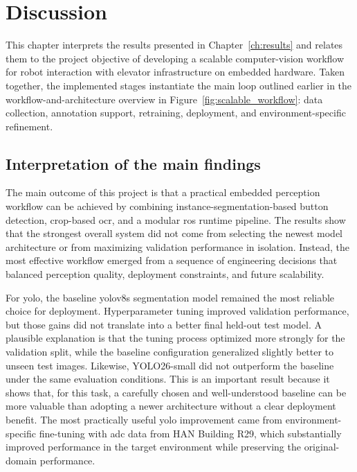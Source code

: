 \chapter{Discussion}
\label{ch:discussion}

This chapter interprets the results presented in Chapter~\ref{ch:results} and relates them to
the project objective of developing a scalable computer-vision
workflow for robot interaction with elevator infrastructure on embedded
hardware. Taken together, the implemented stages instantiate the main loop
outlined earlier in the workflow-and-architecture overview in
Figure~\ref{fig:scalable_workflow}: data collection, annotation support,
retraining, deployment, and environment-specific refinement.

\section{Interpretation of the main findings}

The main outcome of this project is that a practical embedded perception
workflow can be achieved by combining instance-segmentation-based button
detection, crop-based \gls{ocr}, and a modular \gls{ros} runtime pipeline. The
results show that the strongest overall system did not come from selecting the
newest model architecture or from maximizing validation performance in isolation.
Instead, the most effective workflow emerged from a sequence of engineering
decisions that balanced perception quality, deployment constraints, and future
scalability.

For \gls{yolo}, the baseline \gls{yolo}v8s segmentation model remained the most reliable
choice for deployment. Hyperparameter tuning improved validation performance, but
those gains did not translate into a better final held-out test model. A
plausible explanation is that the tuning process optimized more strongly for the
validation split, while the baseline configuration generalized slightly better
to unseen test images. Likewise, YOLO26-small did not outperform the baseline
under the same evaluation conditions. This is an important result because it shows that, for this task, a
carefully chosen and well-understood baseline can be more valuable than adopting
a newer architecture without a clear deployment benefit. The most practically
useful \gls{yolo} improvement came from environment-specific fine-tuning with
\gls{adc} data from HAN Building R29, which substantially improved
performance in the target environment while preserving the original-domain
performance.

